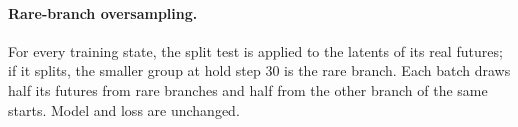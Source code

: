 \documentclass{article}
\begin{document}
\paragraph{Rare-branch oversampling.} For every training state, the split test is applied to the latents
of its real futures; if it splits, the smaller group at hold step 30 is the rare branch. Each batch draws
half its futures from rare branches and half from the other branch of the same starts. Model and loss are
unchanged.
\end{document}
